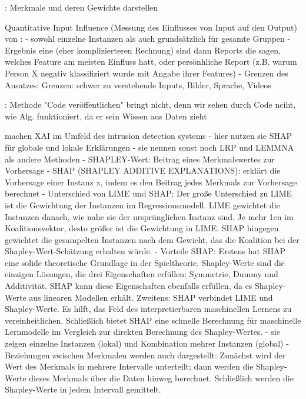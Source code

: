 \cite{goldenfein2019algorithmic}: Merkmale und deren Gewichte darstellen

Quantitative Input Influence (Messung des Einflusses von Input auf den Output) von \cite{datta2016algorithmic}:
- sowohl einzelne Instanzen als auch grundsätzlich für gesamte Gruppen
- Ergebnis eine (eher komplizierteren Rechnung) sind dann Reports die sagen, welches Feature am meisten Einfluss hatt, oder persönhliche Report (z.B. warum Person X negativ klassifiziert wurde mit Angabe ihrer Features)
- Grenzen des Ansatzes: Grenzen: schwer zu verstehende Inputs, Bilder, Sprache, Videos

\cite{blacklaws2018algorithms}: Methode "Code veröffentlichen" bringt nicht, denn wir sehen durch Code nciht, wie Alg. funktioniert, da er sein Wissen aus Daten zieht

\cite{wang2020explainable} machen XAI im Umfeld des intrusion detection systems - hier nutzen sie SHAP für globale und lokale Erklärungen
- sie nennen sonst noch LRP und LEMMNA als andere Methoden
- SHAPLEY-Wert: Beitrag eines Merkmalswertes zur Vorhersage
- SHAP (SHAPLEY ADDITIVE EXPLANATIONS): erklärt die Vorhersage einer Instanz x, indem es den Beitrag jedes Merkmals zur Vorhersage berechnet
- Unterschied von LIME und SHAP: Der große Unterschied zu LIME ist die Gewichtung der Instanzen im Regressionsmodell. LIME gewichtet die Instanzen danach, wie nahe sie der ursprünglichen Instanz sind. Je mehr 1en im Koalitionsvektor, desto größer ist die Gewichtung in LIME. SHAP hingegen gewichtet die gesampelten Instanzen nach dem Gewicht, das die Koalition bei der Shapley-Wert-Schätzung erhalten würde.
- Vorteile SHAP: Erstens hat SHAP eine solide theoretische Grundlage in der Spieltheorie. Shapley-Werte sind die einzigen Lösungen, die drei Eigenschaften erfüllen: Symmetrie, Dummy und Additivität. SHAP kann diese Eigenschaften ebenfalls erfüllen, da es Shapley-Werte aus linearen Modellen erhält. Zweitens: SHAP verbindet LIME und Shapley-Werte. Es hilft, das Feld des interpretierbaren maschinellen Lernens zu vereinheitlichen. Schließlich bietet SHAP eine schnelle Berechnung für maschinelle Lernmodelle im Vergleich zur direkten Berechnung des Shapley-Wertes.
- sie zeigen einzelne Instanzen (lokal) und Kombination mehrer Instanzen (global)
- Beziehungen zwischen Merkmalen werden auch dargestellt: Zunächst wird der Wert des Merkmals in mehrere Intervalle unterteilt; dann werden die Shapley-Werte dieses Merkmals über die Daten hinweg berechnet. Schließlich werden die Shapley-Werte in jedem Intervall gemittelt. 



